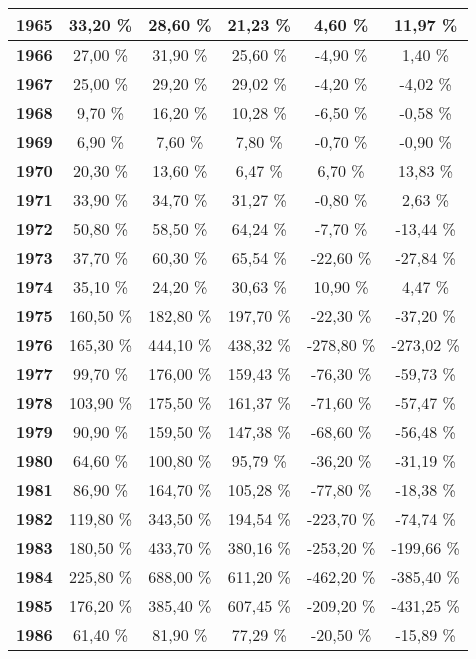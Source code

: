 \begin{center}
\begin{footnotesize}
\begin{longtable}{|c|c|c|c|c|c|}
\textbf{1965} & 33,20 \% & 28,60 \% & 21,23 \% & 4,60 \% & 11,97 \% \\ \hline
\textbf{1966} & 27,00 \% & 31,90 \% & 25,60 \% & -4,90 \% & 1,40 \% \\ \hline
\textbf{1967} & 25,00 \% & 29,20 \% & 29,02 \% & -4,20 \% & -4,02 \% \\ \hline
\textbf{1968} & 9,70 \% & 16,20 \% & 10,28 \% & -6,50 \% & -0,58 \% \\ \hline
\textbf{1969} & 6,90 \% & 7,60 \% & 7,80 \% & -0,70 \% & -0,90 \% \\ \hline
\textbf{1970} & 20,30 \% & 13,60 \% & 6,47 \% & 6,70 \% & 13,83 \% \\ \hline
\textbf{1971} & 33,90 \% & 34,70 \% & 31,27 \% & -0,80 \% & 2,63 \% \\ \hline
\textbf{1972} & 50,80 \% & 58,50 \% & 64,24 \% & -7,70 \% & -13,44 \% \\ \hline
\textbf{1973} & 37,70 \% & 60,30 \% & 65,54 \% & -22,60 \% & -27,84 \% \\ \hline
\textbf{1974} & 35,10 \% & 24,20 \% & 30,63 \% & 10,90 \% & 4,47 \% \\ \hline
\textbf{1975} & 160,50 \% & 182,80 \% & 197,70 \% & -22,30 \% & -37,20 \% \\ \hline
\textbf{1976} & 165,30 \% & 444,10 \% & 438,32 \% & -278,80 \% & -273,02 \% \\ \hline
\textbf{1977} & 99,70 \% & 176,00 \% & 159,43 \% & -76,30 \% & -59,73 \% \\ \hline
\textbf{1978} & 103,90 \% & 175,50 \% & 161,37 \% & -71,60 \% & -57,47 \% \\ \hline
\textbf{1979} & 90,90 \% & 159,50 \% & 147,38 \% & -68,60 \% & -56,48 \% \\ \hline
\textbf{1980} & 64,60 \% & 100,80 \% & 95,79 \% & -36,20 \% & -31,19 \% \\ \hline
\textbf{1981} & 86,90 \% & 164,70 \% & 105,28 \% & -77,80 \% & -18,38 \% \\ \hline
\textbf{1982} & 119,80 \% & 343,50 \% & 194,54 \% & -223,70 \% & -74,74 \% \\ \hline
\textbf{1983} & 180,50 \% & 433,70 \% & 380,16 \% & -253,20 \% & -199,66 \% \\ \hline
\textbf{1984} & 225,80 \% & 688,00 \% & 611,20 \% & -462,20 \% & -385,40 \% \\ \hline
\textbf{1985} & 176,20 \% & 385,40 \% & 607,45 \% & -209,20 \% & -431,25 \% \\ \hline
\textbf{1986} & 61,40 \% & 81,90 \% & 77,29 \% & -20,50 \% & -15,89 \% \\ \hline

\end{longtable}
\end{footnotesize}
\end{center}
